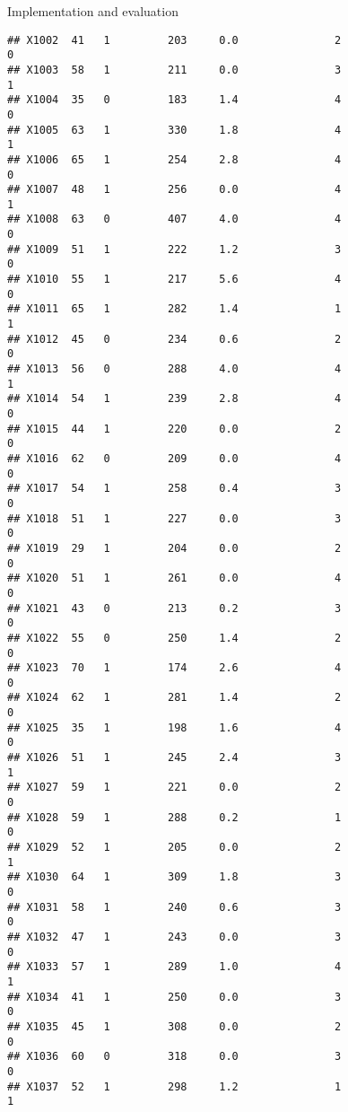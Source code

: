 \documentclass[
  ignorenonframetext,
]{beamer}
\begin{document}
\begin{frame}[fragile]{Implementation and evaluation}
\begin{verbatim}
## X1002  41   1         203     0.0               2                   0
## X1003  58   1         211     0.0               3                   1
## X1004  35   0         183     1.4               4                   0
## X1005  63   1         330     1.8               4                   1
## X1006  65   1         254     2.8               4                   0
## X1007  48   1         256     0.0               4                   1
## X1008  63   0         407     4.0               4                   0
## X1009  51   1         222     1.2               3                   0
## X1010  55   1         217     5.6               4                   0
## X1011  65   1         282     1.4               1                   1
## X1012  45   0         234     0.6               2                   0
## X1013  56   0         288     4.0               4                   1
## X1014  54   1         239     2.8               4                   0
## X1015  44   1         220     0.0               2                   0
## X1016  62   0         209     0.0               4                   0
## X1017  54   1         258     0.4               3                   0
## X1018  51   1         227     0.0               3                   0
## X1019  29   1         204     0.0               2                   0
## X1020  51   1         261     0.0               4                   0
## X1021  43   0         213     0.2               3                   0
## X1022  55   0         250     1.4               2                   0
## X1023  70   1         174     2.6               4                   0
## X1024  62   1         281     1.4               2                   0
## X1025  35   1         198     1.6               4                   0
## X1026  51   1         245     2.4               3                   1
## X1027  59   1         221     0.0               2                   0
## X1028  59   1         288     0.2               1                   0
## X1029  52   1         205     0.0               2                   1
## X1030  64   1         309     1.8               3                   0
## X1031  58   1         240     0.6               3                   0
## X1032  47   1         243     0.0               3                   0
## X1033  57   1         289     1.0               4                   1
## X1034  41   1         250     0.0               3                   0
## X1035  45   1         308     0.0               2                   0
## X1036  60   0         318     0.0               3                   0
## X1037  52   1         298     1.2               1                   1

\end{verbatim}
\end{frame}
\end{document}
